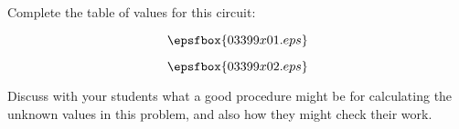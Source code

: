 

Complete the table of values for this circuit:

$$\epsfbox{03399x01.eps}$$







$$\epsfbox{03399x02.eps}$$







Discuss with your students what a good procedure might be for calculating the unknown values in this problem, and also how they might check their work.




